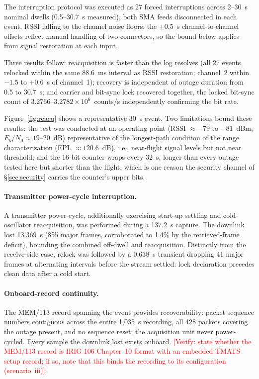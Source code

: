 \documentclass[12pt,letterpaper]{article}
\newcommand{\needsverify}[1]{\textcolor{red}{[Verify: #1]}}
\begin{document}
The interruption protocol was executed as 27 forced interruptions across 2--30~s nominal
dwells (0.5--30.7~s measured), both SMA feeds disconnected in each event, RSSI falling to
the channel noise floors; the ${\pm}0.5$~s channel-to-channel offsets reflect manual
handling of two connectors, so the bound below applies from signal restoration at each
input.

Three results follow: reacquisition is faster than the log resolves (all 27 events relocked
within the same 88.6~ms interval as RSSI restoration; channel~2 within $-1.5$ to $+0.6$~s
of channel~1); recovery is independent of outage duration from 0.5 to 30.7~s; and carrier
and bit-sync lock recovered together, the locked bit-sync count of
$3.2766$--$3.2782 \times 10^{6}$~counts/s independently confirming the bit rate.

Figure~\ref{fig:reacq} shows a representative 30~s event. Two limitations bound these
results: the test was conducted at an operating point (RSSI ${\approx}-79$ to $-81$~dBm,
$E_b/N_0 \approx 19$--20~dB) representative of the longest-path condition of the range
characterization (EPL ${\approx}120.6$~dB), i.e., near-flight signal levels but not near
threshold; and the 16-bit counter wraps every 32~s, longer than every outage tested here
but shorter than the flight, which is one reason the security channel of
\S\ref{sec:security} carries the counter's upper bits.

\paragraph{Transmitter power-cycle interruption.}
A transmitter power-cycle, additionally exercising start-up settling and cold-oscillator
reacquisition, was performed during a 137.2~s capture. The downlink lost 13.369~s (855
major frames, corroborated to 1.4\% by the retrieved-frame deficit), bounding the combined
off-dwell and reacquisition. Distinctly from the receive-side case, relock was followed by a
0.638~s transient dropping 41 major frames at alternating intervals before the stream
settled: lock declaration precedes clean data after a cold start.

\paragraph{Onboard-record continuity.}
The MEM/113 record spanning the event provides recoverability: packet sequence numbers
contiguous across the entire 1{,}035~s recording, all 428 packets covering the outage
present, and no sequence reset; the acquisition unit never power-cycled. Every sample the
downlink lost exists onboard. \needsverify{state whether the MEM/113 record is IRIG 106
Chapter~10 format with an embedded TMATS setup record; if so, note that this binds the
recording to its configuration (scenario~iii)}.
\end{document}
